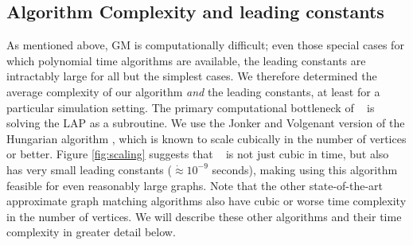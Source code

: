 \documentclass[preprint,11pt]{elsarticle}
\begin{document}
\subsection{Algorithm Complexity and leading constants} %
\label{sub:const}

As mentioned above, GM is computationally difficult; even those special cases for which polynomial time algorithms are available, the leading constants are intractably large for all but the simplest cases. We therefore determined the average complexity of our algorithm \emph{and} the leading constants, at least for a particular simulation setting.  The primary computational bottleneck of \FAQ~ is solving the LAP as a subroutine.  We use the Jonker and Volgenant version of the Hungarian algorithm \cite{Jonker1987, Burkard2009}, which is known to scale cubically in the number of vertices or better.  Figure \ref{fig:scaling} suggests that \FAQ~ is not just cubic in time, but also has very small leading constants ($\dot{\approx} 10^{-9}$ seconds), making using this algorithm feasible for even reasonably large graphs.  Note that the other state-of-the-art approximate graph matching algorithms also have cubic or worse time complexity in the number of vertices.  We will describe these other algorithms and their time complexity in greater detail below.
\end{document}
